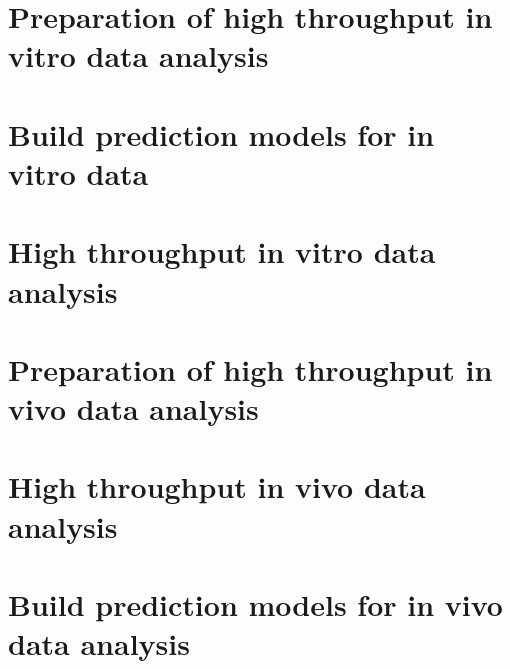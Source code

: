 \documentclass[11pt]{article}
\begin{document}
\section{Preparation of high throughput in vitro data analysis}


\section{Build prediction models for in vitro data}
\section{High throughput in vitro data analysis}
\section{Preparation of high throughput in vivo data analysis}
\section{High throughput in vivo data analysis}
\section{Build prediction models for in vivo data analysis}
\end{document}

